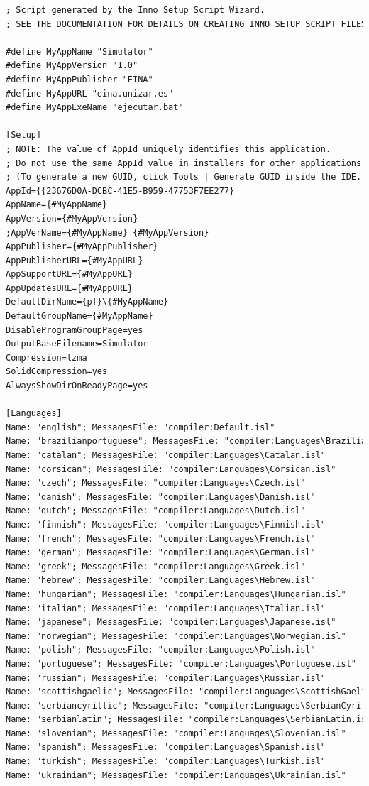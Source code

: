 \begin{lstlisting}[language=xml, frame=single]
; Script generated by the Inno Setup Script Wizard.
; SEE THE DOCUMENTATION FOR DETAILS ON CREATING INNO SETUP SCRIPT FILES!

#define MyAppName "Simulator"
#define MyAppVersion "1.0"
#define MyAppPublisher "EINA"
#define MyAppURL "eina.unizar.es"
#define MyAppExeName "ejecutar.bat"

[Setup]
; NOTE: The value of AppId uniquely identifies this application.
; Do not use the same AppId value in installers for other applications.
; (To generate a new GUID, click Tools | Generate GUID inside the IDE.)
AppId={{23676D0A-DCBC-41E5-B959-47753F7EE277}
AppName={#MyAppName}
AppVersion={#MyAppVersion}
;AppVerName={#MyAppName} {#MyAppVersion}
AppPublisher={#MyAppPublisher}
AppPublisherURL={#MyAppURL}
AppSupportURL={#MyAppURL}
AppUpdatesURL={#MyAppURL}
DefaultDirName={pf}\{#MyAppName}
DefaultGroupName={#MyAppName}
DisableProgramGroupPage=yes
OutputBaseFilename=Simulator
Compression=lzma
SolidCompression=yes
AlwaysShowDirOnReadyPage=yes

[Languages]
Name: "english"; MessagesFile: "compiler:Default.isl"
Name: "brazilianportuguese"; MessagesFile: "compiler:Languages\BrazilianPortuguese.isl"
Name: "catalan"; MessagesFile: "compiler:Languages\Catalan.isl"
Name: "corsican"; MessagesFile: "compiler:Languages\Corsican.isl"
Name: "czech"; MessagesFile: "compiler:Languages\Czech.isl"
Name: "danish"; MessagesFile: "compiler:Languages\Danish.isl"
Name: "dutch"; MessagesFile: "compiler:Languages\Dutch.isl"
Name: "finnish"; MessagesFile: "compiler:Languages\Finnish.isl"
Name: "french"; MessagesFile: "compiler:Languages\French.isl"
Name: "german"; MessagesFile: "compiler:Languages\German.isl"
Name: "greek"; MessagesFile: "compiler:Languages\Greek.isl"
Name: "hebrew"; MessagesFile: "compiler:Languages\Hebrew.isl"
Name: "hungarian"; MessagesFile: "compiler:Languages\Hungarian.isl"
Name: "italian"; MessagesFile: "compiler:Languages\Italian.isl"
Name: "japanese"; MessagesFile: "compiler:Languages\Japanese.isl"
Name: "norwegian"; MessagesFile: "compiler:Languages\Norwegian.isl"
Name: "polish"; MessagesFile: "compiler:Languages\Polish.isl"
Name: "portuguese"; MessagesFile: "compiler:Languages\Portuguese.isl"
Name: "russian"; MessagesFile: "compiler:Languages\Russian.isl"
Name: "scottishgaelic"; MessagesFile: "compiler:Languages\ScottishGaelic.isl"
Name: "serbiancyrillic"; MessagesFile: "compiler:Languages\SerbianCyrillic.isl"
Name: "serbianlatin"; MessagesFile: "compiler:Languages\SerbianLatin.isl"
Name: "slovenian"; MessagesFile: "compiler:Languages\Slovenian.isl"
Name: "spanish"; MessagesFile: "compiler:Languages\Spanish.isl"
Name: "turkish"; MessagesFile: "compiler:Languages\Turkish.isl"
Name: "ukrainian"; MessagesFile: "compiler:Languages\Ukrainian.isl"


\end{lstlisting}

